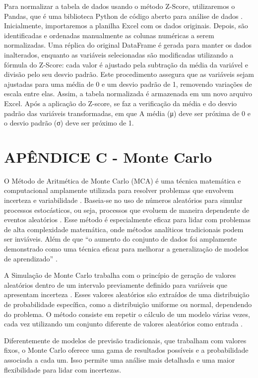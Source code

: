 \begin{apendicesenv}
Para normalizar a tabela de dados usando o método Z-Score, utilizaremos o  Pandas, que é uma biblioteca Python de código aberto para análise de dados \cite{chen2018}. Inicialmente, importaremos a planilha Excel com os dados originais. Depois, são identificadas e ordenadas manualmente as colunas numéricas a serem normalizadas. Uma réplica do original DataFrame é gerada para manter os dados inalterados, enquanto as variáveis selecionadas são modificadas utilizando a fórmula do Z-Score: cada valor é ajustado pela subtração da média da variável e divisão pelo seu desvio padrão. Este procedimento assegura que as variáveis sejam ajustadas para uma média de 0 e um desvio padrão de 1, removendo variações de escala entre elas. Assim, a tabela normalizada é armazenada em um novo arquivo Excel. Após a aplicação do Z-score, se faz a verificação da média e do desvio padrão das variáveis transformadas, em que A média (μ) deve ser próxima de 0 e o desvio padrão (σ) deve ser próximo de 1.

\chapter{APÊNDICE C - Monte Carlo}

O Método de Aritmética de Monte Carlo (MCA) é uma técnica matemática e computacional amplamente utilizada para resolver problemas que envolvem incerteza e variabilidade \cite{kalos2009}. Baseia-se no uso de números aleatórios para simular processos estocásticos, ou seja, processos que evoluem de maneira dependente de eventos aleatórios \cite{kalos2009}. Esse método é especialmente eficaz para lidar com problemas de alta complexidade matemática, onde métodos analíticos tradicionais podem ser inviáveis. Além de que “o aumento do conjunto de dados foi amplamente demonstrado como uma técnica eficaz para melhorar a generalização de modelos de aprendizado” \cite{kiar2021}.

A Simulação de Monte Carlo trabalha com o princípio de geração de valores aleatórios dentro de um intervalo previamente definido para variáveis que apresentam incerteza \cite{kalos2009}. Esses valores aleatórios são extraídos de uma distribuição de probabilidade específica, como a distribuição uniforme ou normal, dependendo do problema. O método consiste em repetir o cálculo de um modelo várias vezes, cada vez utilizando um conjunto diferente de valores aleatórios como entrada \cite{kalos2009}. 

Diferentemente de modelos de previsão tradicionais, que trabalham com valores fixos, o Monte Carlo oferece uma gama de resultados possíveis e a probabilidade associada a cada um. Isso permite uma análise mais detalhada e uma maior flexibilidade para lidar com incertezas.


\end{apendicesenv}
